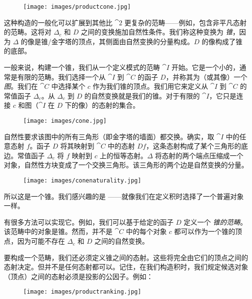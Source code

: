 \begin{figure}[H]
  \centering
  \texttt{[image: images/productcone.jpg]}
\end{figure}

\noindent
这种构造的一般化可以扩展到其他比 $\cat{2}$ 更复杂的范畴——例如，包含非平凡态射的范畴。这将对 $\Delta_c$ 和 $D$ 之间的变换施加自然性条件。我们称这种变换为 \emph{锥}，因为 $\Delta$ 的像是锥/金字塔的顶点，其侧面由自然变换的分量构成。$D$ 的像构成了锥的底部。

一般来说，构建一个锥，我们从一个定义模式的范畴 $\cat{I}$ 开始。它是一个小的，通常是有限的范畴。我们选择一个从 $\cat{I}$ 到 $\cat{C}$ 的函子 $D$，并称其为（或其像）一个 \emph{图}。我们在 $\cat{C}$ 中选择某个 $c$ 作为我们锥的顶点。我们用它来定义从 $\cat{I}$ 到 $\cat{C}$ 的常值函子 $\Delta_c$。从 $\Delta_c$ 到 $D$ 的自然变换就是我们的锥。对于有限的 $\cat{I}$，它只是连接 $c$ 和图（$\cat{I}$ 在 $D$ 下的像）的态射的集合。

\begin{figure}[H]
  \centering
  \texttt{[image: images/cone.jpg]}
\end{figure}

\noindent
自然性要求该图中的所有三角形（即金字塔的墙面）都交换。确实，取 $\cat{I}$ 中的任意态射 $f$。函子 $D$ 将其映射到 $\cat{C}$ 中的态射 $D f$，这条态射构成了某个三角形的底边。常值函子 $\Delta_c$ 将 $f$ 映射到 $c$ 上的恒等态射。$\Delta$ 将态射的两个端点压缩成一个对象，自然性方块变成了一个交换三角形。该三角形的两个边是自然变换的分量。

\begin{figure}[H]
  \centering
  \texttt{[image: images/conenaturality.jpg]}
\end{figure}

\noindent
所以这是一个锥。我们感兴趣的是  ——就像我们在定义积时选择了一个普遍对象一样。

有很多方法可以实现它。例如，我们可以基于给定的函子 $D$ 定义一个 \emph{锥的范畴}。该范畴中的对象是锥。然而，并不是 $\cat{C}$ 中的每个对象 $c$ 都可以作为一个锥的顶点，因为可能不存在 $\Delta_c$ 和 $D$ 之间的自然变换。

要构成一个范畴，我们还必须定义锥之间的态射。这些将完全由它们的顶点之间的态射决定。但并不是任何态射都可以。记住，在我们构造积时，我们规定候选对象（顶点）之间的态射必须是投影的公因子。例如：


\begin{figure}[H]
  \centering
  \texttt{[image: images/productranking.jpg]}
\end{figure}

